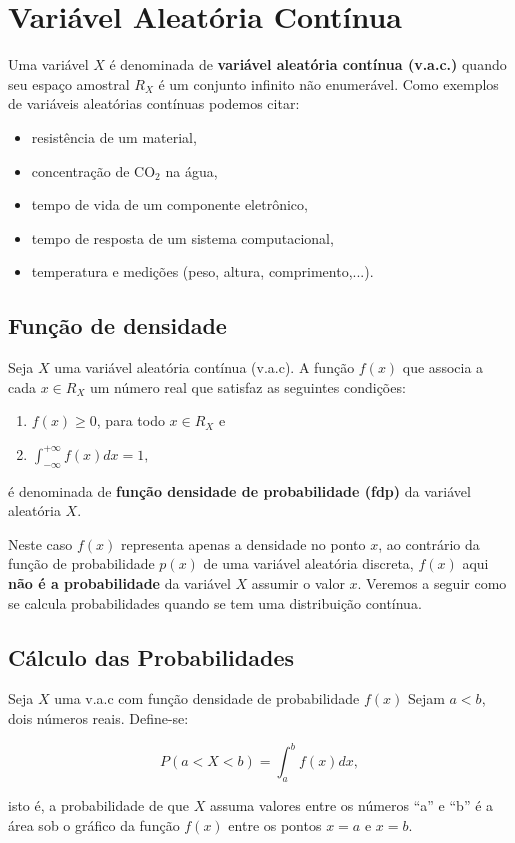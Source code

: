 \documentclass[12pt]{article}   %
\begin{document}
\tableofcontents

\section{Variável Aleatória Contínua}

Uma variável $X$ é denominada de \textbf{variável aleatória contínua (v.a.c.)}
quando seu espaço amostral $R_X$ é um conjunto infinito não enumerável. Como
exemplos de variáveis aleatórias contínuas podemos citar:
\begin{itemize}
    \item resistência de um material,
    \item concentração de CO$_2$ na água,
    \item tempo de vida de um componente eletrônico,
    \item tempo de resposta de um sistema computacional,
    \item temperatura e medições (peso, altura, comprimento,...).
\end{itemize}

\subsection{Função de densidade}

Seja $X$ uma variável aleatória contínua (v.a.c). A função $f(x)$ que associa
a cada $x \in R_X$ um número real que satisfaz as seguintes condições:

\begin{enumerate}
    \item $f(x) \geqslant 0$, para todo $x \in R_X$ e
    \item $\displaystyle\int_{-\infty}^{+\infty}f(x) dx = 1,$
\end{enumerate}

\noindent é denominada de \textbf{função densidade de probabilidade (fdp)} da variável
aleatória $X$.
\par Neste caso $f(x)$ representa apenas a densidade no ponto $x$, ao
contrário da função de probabilidade $p(x)$ de uma variável aleatória discreta,
$f(x)$ aqui \textbf{não é a probabilidade} da variável $X$ assumir o valor $x$. Veremos a
seguir como se calcula probabilidades quando se tem uma distribuição contínua.

\subsection{Cálculo das Probabilidades}

Seja $X$ uma v.a.c com função densidade de probabilidade $f(x)$ Sejam $a < b$,
dois números reais. Define-se:

$$P(a < X < b) = \int_{a}^{b}f(x) dx,$$

\noindent isto é, a probabilidade de que $X$ assuma valores entre os números ``a'' e ``b''
é a área sob o gráfico da função $f(x)$ entre os pontos $x = a$ e $x = b$.
\end{document}
